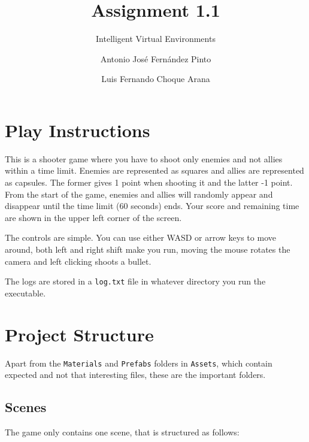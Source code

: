 \documentclass[
	emulatestandardclasses, %
	11pt,
	a4paper,
	toc=bib, %
	parskip=half-,
	numbers=endperiod,
]{scrartcl}
\title{Assignment 1.1}
\subtitle{Intelligent Virtual Environments}
\author{Antonio José Fernández Pinto \and Luis Fernando Choque Arana}
\date{} %
\begin{document}
\maketitle[0]

\vspace{-1cm}

\section{Play Instructions}

This is a shooter game where you have to shoot only enemies and not allies within a time limit. Enemies are represented as squares and allies are represented as capsules. The former gives 1 point when shooting it and the latter -1 point. From the start of the game, enemies and allies will randomly appear and disappear until the time limit (60 seconds) ends. Your score and remaining time are shown in the upper left corner of the screen.

The controls are simple. You can use either WASD or arrow keys to move around, both left and right shift make you run, moving the mouse rotates the camera and left clicking shoots a bullet.

The logs are stored in a \texttt{log.txt} file in whatever directory you run the executable.

\section{Project Structure}

Apart from the \texttt{Materials} and \texttt{Prefabs} folders in \texttt{Assets}, which contain expected and not that interesting files, these are the important folders.

\subsection{Scenes}

The game only contains one scene, that is structured as follows:
\end{document}
